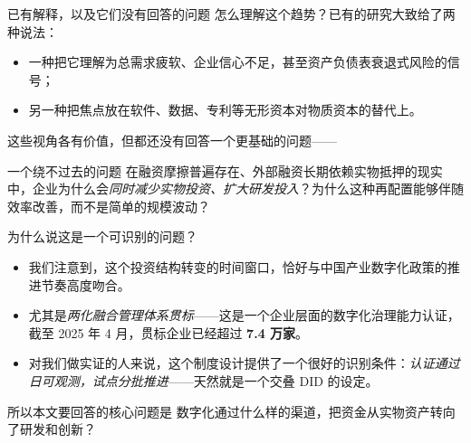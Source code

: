 \begin{frame}{已有解释，以及它们没有回答的问题}
  怎么理解这个趋势？已有的研究大致给了两种说法：

  \begin{itemize}
    \item 一种把它理解为总需求疲软、企业信心不足，甚至资产负债表衰退式风险的信号；
    \item 另一种把焦点放在软件、数据、专利等无形资本对物质资本的替代上。
  \end{itemize}

  \vspace{0.5em}
  这些视角各有价值，但都还没有回答一个更基础的问题——

  \begin{cautionbox}{一个绕不过去的问题}
    在融资摩擦普遍存在、外部融资长期依赖实物抵押的现实中，企业为什么会\emph{同时减少实物投资、扩大研发投入}？为什么这种再配置能够伴随效率改善，而不是简单的规模波动？
  \end{cautionbox}
\end{frame}

\begin{frame}{为什么说这是一个可识别的问题？}
  \begin{itemize}
    \item 我们注意到，这个投资结构转变的时间窗口，恰好与中国产业数字化政策的推进节奏高度吻合。
    \item 尤其是\emph{两化融合管理体系贯标}——这是一个企业层面的数字化治理能力认证，截至 2025 年 4 月，贯标企业已经超过 \textbf{7.4 万家}。
    \item 对我们做实证的人来说，这个制度设计提供了一个很好的识别条件：\emph{认证通过日可观测，试点分批推进}——天然就是一个交叠 DID 的设定。
  \end{itemize}

  \begin{findingbox}{所以本文要回答的核心问题是}
    数字化通过什么样的渠道，把资金从实物资产转向了研发和创新？
  \end{findingbox}
\end{frame}

